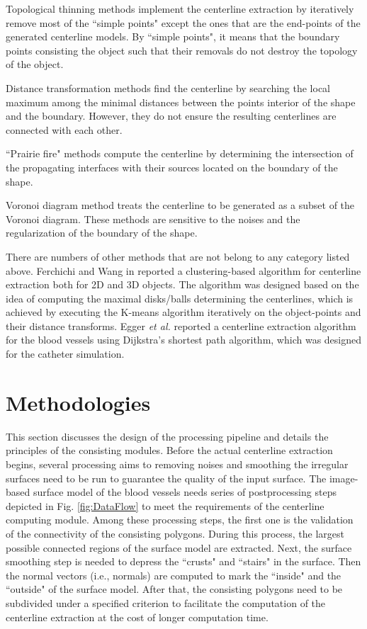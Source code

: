 Topological thinning methods \cite{Ma2002,Sadleir2002} implement the centerline extraction by iteratively remove most of the ``simple points" except the ones that are the end-points of the generated centerline models. %
By ``simple points", it means that the boundary points consisting the object such that their removals do not destroy the topology of the object.

Distance transformation methods \cite{Niblack1992} find the centerline by searching the local maximum among the minimal distances between the points interior of the shape and the boundary. %
However, they do not ensure the resulting centerlines are connected with each other.

``Prairie fire" methods \cite{Blum1967,Leymarie1992} compute the centerline by determining the intersection of the propagating interfaces with their sources located on the boundary of the shape. %

Voronoi diagram method \cite{Sherbrooke1996,Antiga2003} treats the centerline to be generated as a subset of the Voronoi diagram.
These methods are sensitive to the noises and the regularization of the boundary of the shape.

There are numbers of other methods that are not belong to any category listed above.
Ferchichi and Wang in \cite{Ferchichi2006} reported a clustering-based algorithm for centerline extraction both for 2D and 3D objects.
The algorithm was designed based on the idea of computing the maximal disks/balls determining the centerlines, which is achieved by executing the K-means algorithm iteratively on the object-points and their distance transforms. %
Egger \textit{et al.} \cite{Egger2007} reported a centerline extraction algorithm for the blood vessels using Dijkstra's shortest path algorithm, which was designed for the catheter simulation. %

\section{Methodologies}

This section discusses the design of the processing pipeline and details the principles of the consisting modules.
Before the actual centerline extraction begins, several processing aims to removing noises and smoothing the irregular surfaces need to be run to guarantee the quality of the input surface.
The image-based surface model of the blood vessels needs series of postprocessing steps depicted in Fig. \ref{fig:DataFlow} to meet the requirements of the centerline computing module. %
Among these processing steps, the first one is the validation of the connectivity of the consisting polygons.
During this process, the largest possible connected regions of the surface model are extracted.
Next, the surface smoothing step is needed to depress the ``crusts" and ``stairs" in the surface.
Then the normal vectors (i.e., normals) are computed to mark the ``inside" and the ``outside" of the surface model.
After that, the consisting polygons need to be subdivided under a specified criterion to facilitate the computation of the centerline extraction at the cost of longer computation time. %

